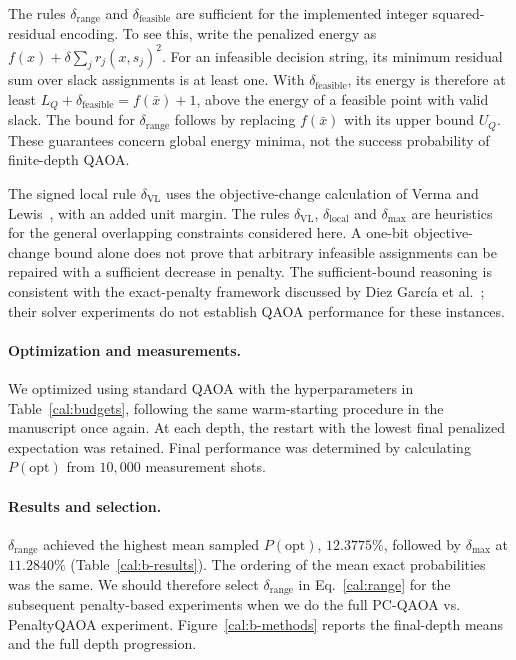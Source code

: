 The rules $\delta_{\mathrm{range}}$ and $\delta_{\mathrm{feasible}}$ are sufficient for the implemented integer squared-residual encoding. To see this, write the penalized energy as $f(x)+\delta\sum_j r_j(x,s_j)^2$. For an infeasible decision string, its minimum residual sum over slack assignments is at least one. With $\delta_{\mathrm{feasible}}$, its energy is therefore at least $L_Q+\delta_{\mathrm{feasible}}=f(\bar x)+1$, above the energy of a feasible point with valid slack. The bound for $\delta_{\mathrm{range}}$ follows by replacing $f(\bar x)$ with its upper bound $U_Q$. These guarantees concern global energy minima, not the success probability of finite-depth QAOA.

The signed local rule $\delta_{\mathrm{VL}}$ uses the objective-change calculation of Verma and Lewis~\cite{cal:verma}, with an added unit margin. The rules $\delta_{\mathrm{VL}}$, $\delta_{\mathrm{local}}$ and $\delta_{\mathrm{max}}$ are heuristics for the general overlapping constraints considered here. A one-bit objective-change bound alone does not prove that arbitrary infeasible assignments can be repaired with a sufficient decrease in penalty. The sufficient-bound reasoning is consistent with the exact-penalty framework discussed by Diez Garc\'ia et al.~\cite{cal:garcia}; their solver experiments do not establish QAOA performance for these instances.

\paragraph{Optimization and measurements.}
We optimized using standard QAOA with the hyperparameters in Table~\ref{cal:budgets}, following the same warm-starting procedure in the manuscript once again. At each depth, the restart with the lowest final penalized expectation was retained. Final performance was determined by calculating $P(\mathrm{opt})$ from $10{,}000$ measurement shots. 

\paragraph{Results and selection.}
$\delta_{\mathrm{range}}$ achieved the highest mean sampled $P(\mathrm{opt})$, $12.3775\%$, followed by $\delta_{\mathrm{max}}$ at $11.2840\%$ (Table~\ref{cal:b-results}). The ordering of the mean exact probabilities was the same. We should therefore select $\delta_{\mathrm{range}}$ in Eq.~\eqref{cal:range} for the subsequent penalty-based experiments when we do the full PC-QAOA vs. PenaltyQAOA experiment. Figure~\ref{cal:b-methods} reports the final-depth means and the full depth progression.

